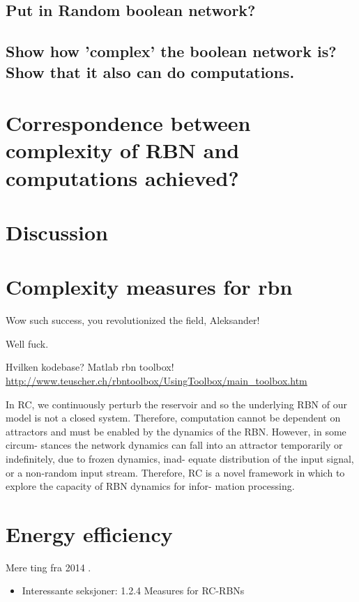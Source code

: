 \subsection{Put in Random boolean network?}

\subsection{Show how 'complex' the boolean network is? Show that it also can do computations.}

\section{Correspondence between complexity of RBN and computations achieved?}

\section{Discussion}

\section{Complexity measures for rbn}
Wow such success, you revolutionized the field, Aleksander!

Well fuck\cite{reservoir-rbn}.

Hvilken kodebase? Matlab rbn toolbox! \url{http://www.teuscher.ch/rbntoolbox/UsingToolbox/main\_toolbox.htm}

In RC, we continuously
perturb the reservoir and so the underlying RBN of our
model  is  not  a  closed  system.   Therefore,  computation
cannot be dependent on attractors and must be enabled
by the dynamics of the RBN. However, in some circum-
stances the network dynamics can fall into an attractor
temporarily or indefinitely, due to frozen dynamics, inad-
equate distribution of the input signal, or a non-random input  stream.   Therefore,  RC  is  a  novel  framework  in
which to explore the capacity of RBN dynamics for infor-
mation processing.

\section{Energy efficiency}
Mere ting fra 2014 \cite{reservoir-rbn-energy-efficiency}.
\begin{itemize}
  \item Interessante seksjoner: 1.2.4 Measures for RC-RBNs
\end{itemize}


